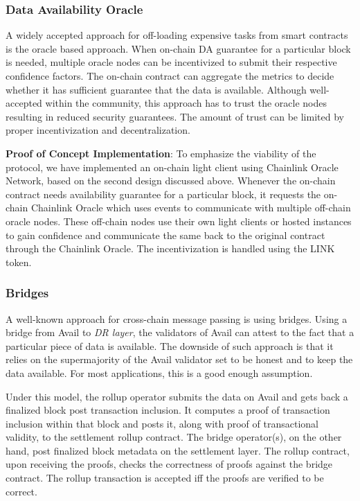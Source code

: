 \documentclass[sigconf, screen=true, nonacm]{acmart}
\newcommand{\DR}{\textit{DR layer}}
\begin{document}
        \subsubsection{Data Availability Oracle}
            A widely accepted approach for off-loading expensive tasks from smart contracts is the oracle based approach. When on-chain DA guarantee for a particular block is needed, multiple oracle nodes can be incentivized to submit their respective confidence factors. The on-chain contract can aggregate the metrics to decide whether it has sufficient guarantee that the data is available. Although well-accepted within the community, this approach has to trust the oracle nodes resulting in reduced security guarantees. The amount of trust can be limited by proper incentivization and decentralization. 

            \textbf{Proof of Concept Implementation}: To emphasize the viability of the protocol, we have implemented an on-chain light client using Chainlink Oracle Network, based on the second design discussed above. Whenever the on-chain contract needs availability guarantee for a particular block, it requests the on-chain Chainlink Oracle which uses events to communicate with multiple off-chain oracle nodes. These off-chain nodes use their own light clients or hosted instances to gain confidence and communicate the same back to the original contract through the Chainlink Oracle. The incentivization is handled using the LINK token. 

        \subsubsection{Bridges}
            A well-known approach for cross-chain message passing is using bridges. Using a bridge from Avail to \DR, the validators of Avail can attest to the fact that a particular piece of data is available. The downside of such approach is that it relies on the supermajority of the Avail validator set to be honest and to keep the data available. For most applications, this is a good enough assumption. 

            Under this model, the rollup operator submits the data on Avail and gets back a finalized block post transaction inclusion. It computes a proof of transaction inclusion within that block and posts it, along with proof of transactional validity, to the settlement rollup contract. The bridge operator(s), on the other hand, post finalized block metadata on the settlement layer. The rollup contract, upon receiving the proofs, checks the correctness of proofs against the bridge contract. The rollup transaction is accepted iff the proofs are verified to be correct. 
            
\end{document}
